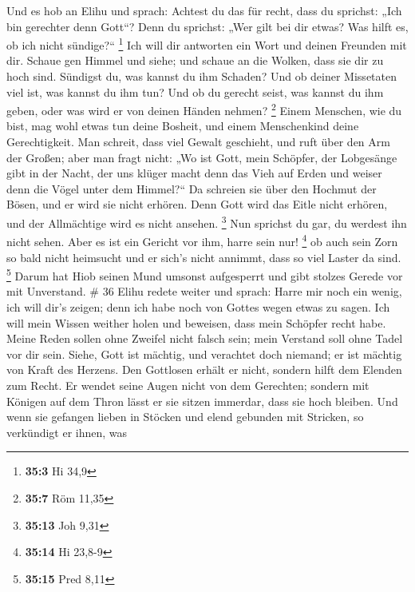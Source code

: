  Und es hob an Elihu und sprach:  Achtest du
das für recht, dass du sprichst: „Ich bin gerechter denn Gott``?
 Denn du sprichst: „Wer gilt bei dir etwas? Was hilft es,
ob ich nicht sündige?{}`` \footnote{\textbf{35:3} Hi 34,9}
 Ich will dir antworten ein Wort und deinen Freunden mit
dir.  Schaue gen Himmel und siehe; und schaue an die
Wolken, dass sie dir zu hoch sind.  Sündigst du, was
kannst du ihm Schaden? Und ob deiner Missetaten viel ist, was kannst du
ihm tun?  Und ob du gerecht seist, was kannst du ihm
geben, oder was wird er von deinen Händen nehmen? \footnote{\textbf{35:7}
  Röm 11,35}  Einem Menschen, wie du bist, mag wohl etwas
tun deine Bosheit, und einem Menschenkind deine Gerechtigkeit.
 Man schreit, dass viel Gewalt geschieht, und ruft über
den Arm der Großen;  aber man fragt nicht: „Wo ist Gott,
mein Schöpfer, der Lobgesänge gibt in der Nacht,  der uns
klüger macht denn das Vieh auf Erden und weiser denn die Vögel unter dem
Himmel?{}``  Da schreien sie über den Hochmut der Bösen,
und er wird sie nicht erhören.  Denn Gott wird das Eitle
nicht erhören, und der Allmächtige wird es nicht ansehen. \footnote{\textbf{35:13}
  Joh 9,31}  Nun sprichst du gar, du werdest ihn nicht
sehen. Aber es ist ein Gericht vor ihm, harre sein nur! \footnote{\textbf{35:14}
  Hi 23,8-9}  ob auch sein Zorn so bald nicht heimsucht
und er sich's nicht annimmt, dass so viel Laster da sind. \footnote{\textbf{35:15}
  Pred 8,11}  Darum hat Hiob seinen Mund umsonst
aufgesperrt und gibt stolzes Gerede vor mit Unverstand. \# 36
 Elihu redete weiter und sprach:  Harre mir
noch ein wenig, ich will dir's zeigen; denn ich habe noch von Gottes
wegen etwas zu sagen.  Ich will mein Wissen weither holen
und beweisen, dass mein Schöpfer recht habe.  Meine Reden
sollen ohne Zweifel nicht falsch sein; mein Verstand soll ohne Tadel vor
dir sein.  Siehe, Gott ist mächtig, und verachtet doch
niemand; er ist mächtig von Kraft des Herzens.  Den
Gottlosen erhält er nicht, sondern hilft dem Elenden zum Recht.
 Er wendet seine Augen nicht von dem Gerechten; sondern
mit Königen auf dem Thron lässt er sie sitzen immerdar, dass sie hoch
bleiben.  Und wenn sie gefangen lieben in Stöcken und
elend gebunden mit Stricken,  so verkündigt er ihnen, was
